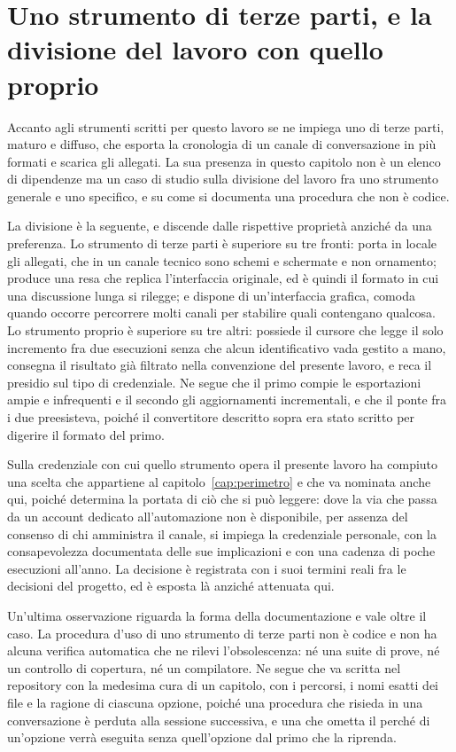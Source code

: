 \section{Uno strumento di terze parti, e la divisione del lavoro con quello proprio}

Accanto agli strumenti scritti per questo lavoro se ne impiega uno di terze parti, maturo e diffuso, che esporta la cronologia di un canale di conversazione in più formati e scarica gli allegati. La sua presenza in questo capitolo non è un elenco di dipendenze ma un caso di studio sulla divisione del lavoro fra uno strumento generale e uno specifico, e su come si documenta una procedura che non è codice.

La divisione è la seguente, e discende dalle rispettive proprietà anziché da una preferenza. Lo strumento di terze parti è superiore su tre fronti: porta in locale gli allegati, che in un canale tecnico sono schemi e schermate e non ornamento; produce una resa che replica l'interfaccia originale, ed è quindi il formato in cui una discussione lunga si rilegge; e dispone di un'interfaccia grafica, comoda quando occorre percorrere molti canali per stabilire quali contengano qualcosa. Lo strumento proprio è superiore su tre altri: possiede il cursore che legge il solo incremento fra due esecuzioni senza che alcun identificativo vada gestito a mano, consegna il risultato già filtrato nella convenzione del presente lavoro, e reca il presidio sul tipo di credenziale. Ne segue che il primo compie le esportazioni ampie e infrequenti e il secondo gli aggiornamenti incrementali, e che il ponte fra i due preesisteva, poiché il convertitore descritto sopra era stato scritto per digerire il formato del primo.

Sulla credenziale con cui quello strumento opera il presente lavoro ha compiuto una scelta che appartiene al capitolo~\ref{cap:perimetro} e che va nominata anche qui, poiché determina la portata di ciò che si può leggere: dove la via che passa da un account dedicato all'automazione non è disponibile, per assenza del consenso di chi amministra il canale, si impiega la credenziale personale, con la consapevolezza documentata delle sue implicazioni e con una cadenza di poche esecuzioni all'anno. La decisione è registrata con i suoi termini reali fra le decisioni del progetto, ed è esposta là anziché attenuata qui.

Un'ultima osservazione riguarda la forma della documentazione e vale oltre il caso. La procedura d'uso di uno strumento di terze parti non è codice e non ha alcuna verifica automatica che ne rilevi l'obsolescenza: né una suite di prove, né un controllo di copertura, né un compilatore. Ne segue che va scritta nel repository con la medesima cura di un capitolo, con i percorsi, i nomi esatti dei file e la ragione di ciascuna opzione, poiché una procedura che risieda in una conversazione è perduta alla sessione successiva, e una che ometta il perché di un'opzione verrà eseguita senza quell'opzione dal primo che la riprenda.

